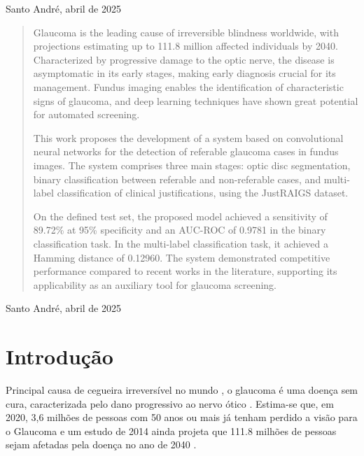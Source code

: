 \documentclass[12pt]{article}
\begin{document}
\begin{center}
Santo André, abril de 2025
\end{center}

\newpage
\bigskip




\begin{center}
\end{center}

\begin{quote}

Glaucoma is the leading cause of irreversible blindness worldwide, with projections estimating up to 111.8 million affected individuals by 2040. Characterized by progressive damage to the optic nerve, the disease is asymptomatic in its early stages, making early diagnosis crucial for its management. Fundus imaging enables the identification of characteristic signs of glaucoma, and deep learning techniques have shown great potential for automated screening.

This work proposes the development of a system based on convolutional neural networks for the detection of referable glaucoma cases in fundus images. The system comprises three main stages: optic disc segmentation, binary classification between referable and non-referable cases, and multi-label classification of clinical justifications, using the JustRAIGS dataset.

On the defined test set, the proposed model achieved a sensitivity of 89.72\% at 95\% specificity and an AUC-ROC of 0.9781 in the binary classification task. In the multi-label classification task, it achieved a Hamming distance of 0.12960. The system demonstrated competitive performance compared to recent works in the literature, supporting its applicability as an auxiliary tool for glaucoma screening.

\end{quote}

\begin{center}
Santo André, abril de 2025
\end{center}

\newpage
\bigskip




\section{Introdução}
\label{sec:introducao}

Principal causa de cegueira irreversível no mundo \cite{steinmetz_causes_2021}, o glaucoma é uma doença sem cura, caracterizada pelo dano progressivo ao nervo ótico \cite{who_2019}. Estima-se que, em 2020, 3,6 milhões de pessoas com 50 anos ou mais já tenham perdido a visão para o Glaucoma \cite{steinmetz_causes_2021} e um estudo de 2014 ainda projeta que 111.8 milhões de pessoas sejam afetadas pela doença no ano de 2040 \cite{tham_global_2014}.
\end{document}
